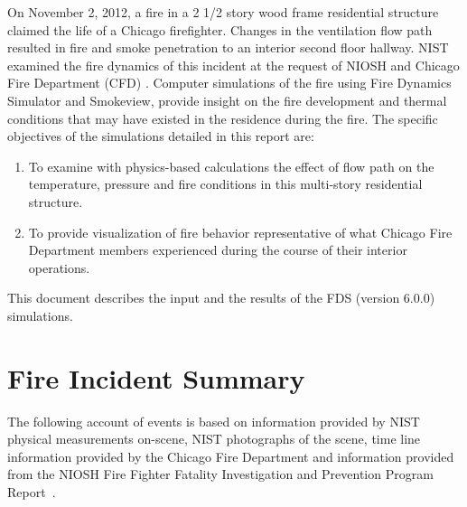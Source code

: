 \documentclass[11pt,oneside]{book}
\begin{document}
On November 2, 2012, a fire in a 2 1/2 story wood frame residential structure claimed the life of a Chicago firefighter.  Changes in the ventilation flow path resulted in fire and smoke penetration to an interior second floor hallway. NIST examined the fire dynamics of this incident at the request of NIOSH and Chicago Fire Department (CFD) . Computer simulations of the fire using Fire Dynamics Simulator and Smokeview, provide insight on the fire development and thermal conditions that may have existed in the residence during the fire. The specific objectives of the simulations detailed in this report are: 
\begin{enumerate}
\item To examine with physics-based calculations the effect of flow path on the temperature, pressure and fire conditions in this multi-story residential structure.
\item To provide visualization of fire behavior representative of what Chicago Fire Department members experienced during the course of their interior operations.
\end{enumerate}
This document describes the input and the results of the FDS (version 6.0.0) simulations.



\chapter{Fire Incident Summary}
\label{fire_sum}
The following account of events is based on information provided by NIST physical measurements on-scene, NIST photographs of the scene, time line information provided by the Chicago Fire Department and information provided from the NIOSH Fire Fighter Fatality Investigation and Prevention Program Report~\cite{NIOSH:Bowyer}.
\end{document}
